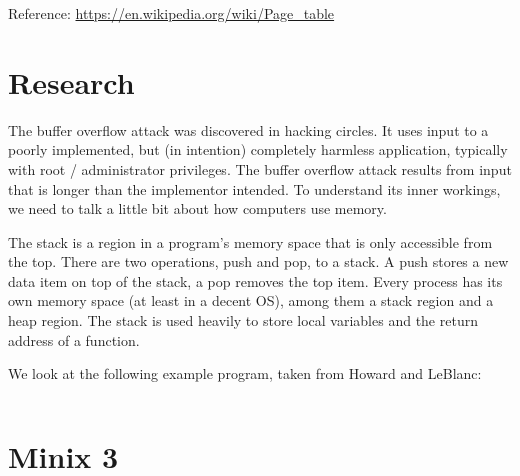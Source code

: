 \documentclass{article}
\begin{document}
Reference: \url{https://en.wikipedia.org/wiki/Page_table}

\section{Research}
The buffer overflow attack was discovered in hacking circles. It uses input to a poorly implemented, but (in intention) completely harmless application, typically with root / administrator privileges. The buffer overflow attack results from input that is longer than the implementor intended. To understand its inner workings, we need to talk a little bit about how computers use memory.

The stack is a region in a program's memory space that is only accessible from the top. There are two operations, push and pop, to a stack. A push stores a new data item on top of the stack, a pop removes the top item. Every process has its own memory space (at least in a decent OS), among them a stack region and a heap region. The stack is used heavily to store local variables and the return address of a function.

We look at the following example program, taken from Howard and LeBlanc:

\inputminted{c}{ex3.c}

\section{Minix 3}
\end{document}
